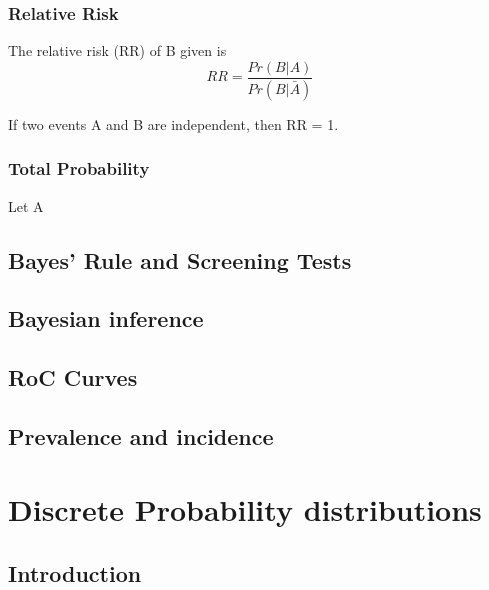 \documentclass[12pt,]{article}
\begin{document}
\hypertarget{relative-risk}{%
\subsubsection{Relative Risk}\label{relative-risk}}

The relative risk (RR) of B given is
\[RR=\frac{Pr(B|A)}{Pr(B|\bar{A})}\]

If two events A and B are independent, then RR = 1.

\hypertarget{total-probability}{%
\subsubsection{Total Probability}\label{total-probability}}

Let A

\hypertarget{bayes-rule-and-screening-tests}{%
\subsection{Bayes' Rule and Screening
Tests}\label{bayes-rule-and-screening-tests}}

\hypertarget{bayesian-inference}{%
\subsection{Bayesian inference}\label{bayesian-inference}}

\hypertarget{roc-curves}{%
\subsection{RoC Curves}\label{roc-curves}}

\hypertarget{prevalence-and-incidence}{%
\subsection{Prevalence and incidence}\label{prevalence-and-incidence}}

\hypertarget{discrete-probability-distributions}{%
\section{Discrete Probability
distributions}\label{discrete-probability-distributions}}

\hypertarget{introduction}{%
\subsection{Introduction}\label{introduction}}
\end{document}
